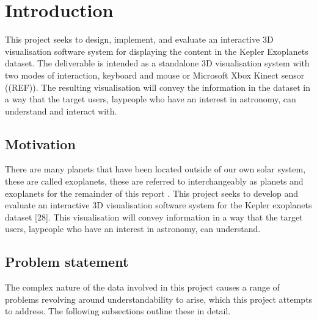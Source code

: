 \chapter{Introduction}\label{C:intro}
This project seeks to design, implement, and evaluate an interactive 3D visualisation software system for displaying the content in the Kepler Exoplanets dataset. The deliverable is intended as a standalone 3D visualisation system with two modes of interaction, keyboard and mouse or Microsoft Xbox Kinect sensor ((REF)). The resulting visualisation will convey the information in the dataset in a way that the target users, laypeople who have an interest in astronomy, can understand and interact with.
\section{Motivation}
There are many planets that have been located outside of our own solar system, these are
called exoplanets, these are referred to interchangeably as planets and exoplanets for the remainder of this report
. This project seeks to develop and evaluate an interactive 3D visualisation
software system for the Kepler exoplanets dataset [28]. This visualisation will convey information
in a way that the target users, laypeople who have an interest in astronomy, can
understand.
\section{Problem statement}
The complex nature of the data involved in this project causes a range of problems revolving around understandability to arise, which this project attempts to address. The following subsections outline these in detail.
